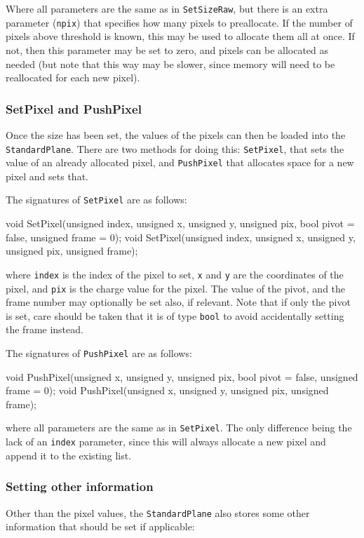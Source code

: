 Where all parameters are the same as in \texttt{SetSizeRaw}, but there is an extra parameter (\texttt{npix})
that specifies how many pixels to preallocate.
If the number of pixels above threshold is known, this may be used to allocate them all at once.
If not, then this parameter may be set to zero, and pixels can be allocated as needed
(but note that this way may be slower, since memory will need to be reallocated for each new pixel).

\subsubsection{SetPixel and PushPixel}
Once the size has been set, the values of the pixels can then be loaded into the \texttt{StandardPlane}.
There are two methods for doing this: \texttt{SetPixel}, that sets the value of an already allocated pixel,
and \texttt{PushPixel} that allocates space for a new pixel and sets that.

The signatures of \texttt{SetPixel} are as follows:
\begin{listing}
void SetPixel(unsigned index, unsigned x, unsigned y, unsigned pix,
              bool pivot = false, unsigned frame = 0);
void SetPixel(unsigned index, unsigned x, unsigned y, unsigned pix,
              unsigned frame);
\end{listing}

where \texttt{index} is the index of the pixel to set, \texttt{x} and \texttt{y} are the coordinates of the pixel,
and \texttt{pix} is the charge value for the pixel.
The value of the pivot, and the frame number may optionally be set also, if relevant.
Note that if only the pivot is set, care should be taken that it is of type \texttt{bool}
to avoid accidentally setting the frame instead.

The signatures of \texttt{PushPixel} are as follows:
\begin{listing}
void PushPixel(unsigned x, unsigned y, unsigned pix,
               bool pivot = false, unsigned frame = 0);
void PushPixel(unsigned x, unsigned y, unsigned pix,
               unsigned frame);
\end{listing}

where all parameters are the same as in \texttt{SetPixel}.
The only difference being the lack of an \texttt{index} parameter,
since this will always allocate a new pixel and append it to the existing list.

\subsubsection{Setting other information}
Other than the pixel values, the \texttt{StandardPlane} also stores some other information
that should be set if applicable:

